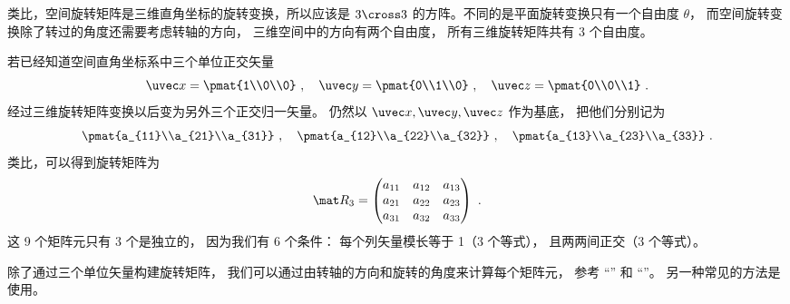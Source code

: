 
\begin{issues}
\issueDraft
\end{issues}


类比，空间旋转矩阵是三维直角坐标的旋转变换，所以应该是 $3 \cross 3$ 的方阵。不同的是平面旋转变换只有一个自由度 $\theta $， 而空间旋转变换除了转过的角度还需要考虑转轴的方向， 三维空间中的方向有两个自由度， 所有三维旋转矩阵共有 3 个自由度。

若已经知道空间直角坐标系中三个单位正交矢量
\begin{equation}
\uvec x=\pmat{1\\0\\0}~, \quad
\uvec y=\pmat{0\\1\\0}~, \quad
\uvec z=\pmat{0\\0\\1}~.
\end{equation}
经过三维旋转矩阵变换以后变为另外三个正交归一矢量。 仍然以 $\uvec x, \uvec y, \uvec z$ 作为基底， 把他们分别记为
\begin{equation}\label{eq_Rot3D_1}
\pmat{a_{11}\\a_{21}\\a_{31}} ~,\quad \pmat{a_{12}\\a_{22}\\a_{32}} ~,\quad \pmat{a_{13}\\a_{23}\\a_{33}}~.
\end{equation}
类比，可以得到旋转矩阵为
\begin{equation}\label{eq_Rot3D_2}
\mat R_3 = \begin{pmatrix}
{a_{11}}&{a_{12}}&{a_{13}}\\
{a_{21}}&{a_{22}}&{a_{23}}\\
{a_{31}}&{a_{32}}&{a_{33}}
\end{pmatrix}~.\end{equation}
这 9 个矩阵元只有 3 个是独立的， 因为我们有 6 个条件： 每个列矢量模长等于 1（3 个等式）， 且两两间正交（3 个等式）。

除了通过三个单位矢量构建旋转矩阵， 我们可以通过由转轴的方向和旋转的角度来计算每个矩阵元， 参考 “” 和 “”。 另一种常见的方法是使用。

